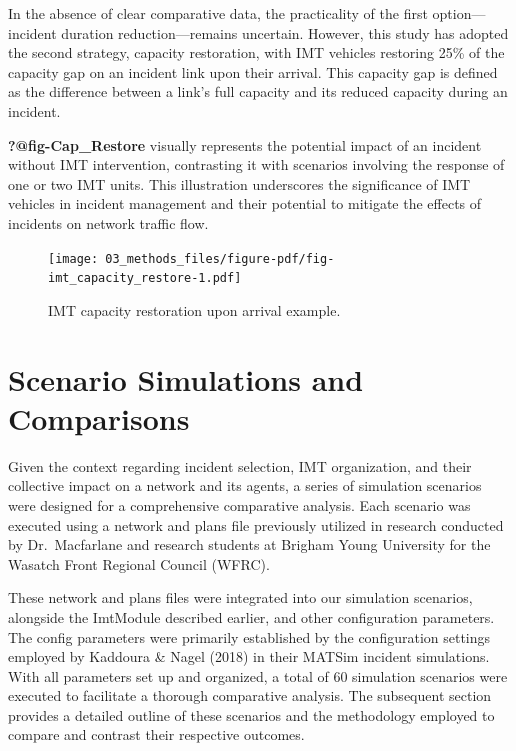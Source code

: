 \documentclass[fancy, oneside, mastersfancy, ms]{byuthesis}
\begin{document}
In the absence of clear comparative data, the practicality of the first
option---incident duration reduction---remains uncertain. However, this
study has adopted the second strategy, capacity restoration, with IMT
vehicles restoring 25\% of the capacity gap on an incident link upon
their arrival. This capacity gap is defined as the difference between a
link's full capacity and its reduced capacity during an incident.

\textbf{?@fig-Cap\_Restore} visually represents the potential impact of
an incident without IMT intervention, contrasting it with scenarios
involving the response of one or two IMT units. This illustration
underscores the significance of IMT vehicles in incident management and
their potential to mitigate the effects of incidents on network traffic
flow.

\begin{figure}

{\centering \texttt{[image: 03\_methods\_files/figure-pdf/fig-imt\_capacity\_restore-1.pdf]}

}

\caption{\label{fig-imt_capacity_restore}IMT capacity restoration upon
arrival example.}

\end{figure}

\hypertarget{scenario-simulations-and-comparisons}{%
\section{Scenario Simulations and
Comparisons}\label{scenario-simulations-and-comparisons}}

Given the context regarding incident selection, IMT organization, and
their collective impact on a network and its agents, a series of
simulation scenarios were designed for a comprehensive comparative
analysis. Each scenario was executed using a network and plans file
previously utilized in research conducted by Dr.~Macfarlane and research
students at Brigham Young University for the Wasatch Front Regional
Council (WFRC).

These network and plans files were integrated into our simulation
scenarios, alongside the ImtModule described earlier, and other
configuration parameters. The config parameters were primarily
established by the configuration settings employed by Kaddoura \& Nagel
(2018) in their MATSim incident simulations. With all parameters set up
and organized, a total of 60 simulation scenarios were executed to
facilitate a thorough comparative analysis. The subsequent section
provides a detailed outline of these scenarios and the methodology
employed to compare and contrast their respective outcomes.
\end{document}
